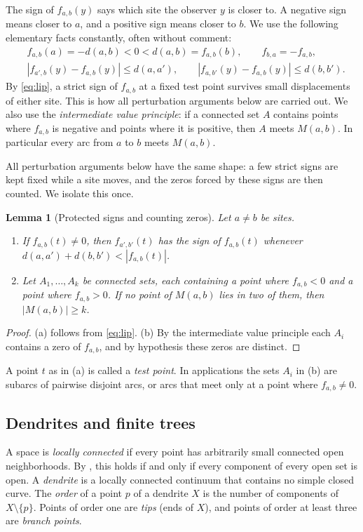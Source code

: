 \documentclass[11pt]{amsart}
\newtheorem{lemma}[theorem]{Lemma}
\theoremstyle{definition}
\theoremstyle{remark}
\newcommand{\M}{M}
\begin{document}
\noindent
The sign of $f_{a,b}(y)$ says which site the observer $y$ is closer to. A negative sign means closer to $a$, and a positive sign means closer to $b$. We use the following elementary facts constantly, often without comment:
\begin{align}
 &f_{a,b}(a)=-d(a,b)<0<d(a,b)=f_{a,b}(b), \qquad f_{b,a}=-f_{a,b}, \label{eq:basic}\\
 &|f_{a',b}(y)-f_{a,b}(y)|\le d(a,a'),\qquad |f_{a,b'}(y)-f_{a,b}(y)|\le d(b,b'). \label{eq:lip}
\end{align}
By \eqref{eq:lip}, a strict sign of $f_{a,b}$ at a fixed test point survives small displacements of either site. This is how all perturbation arguments below are carried out. We also use the \emph{intermediate value principle}: if a connected set $A$ contains points where $f_{a,b}$ is negative and points where it is positive, then $A$ meets $\M(a,b)$. In particular every arc from $a$ to $b$ meets $\M(a,b)$.

All perturbation arguments below have the same shape: a few strict signs are kept fixed while a site moves, and the zeros forced by these signs are then counted. We isolate this once.

\begin{lemma}[Protected signs and counting zeros]\label{lem:count}
Let $a\ne b$ be sites.
\begin{enumerate}[label=\textup{(\alph*)}]
\item If $f_{a,b}(t)\ne0$, then $f_{a',b'}(t)$ has the sign of $f_{a,b}(t)$ whenever $d(a,a')+d(b,b')<|f_{a,b}(t)|$.
\item Let $A_1,\dots,A_k$ be connected sets, each containing a point where $f_{a,b}<0$ and a point where $f_{a,b}>0$. If no point of $\M(a,b)$ lies in two of them, then $|\M(a,b)|\ge k$.
\end{enumerate}
\end{lemma}
\begin{proof}
(a) follows from \eqref{eq:lip}. (b) By the intermediate value principle each $A_i$ contains a zero of $f_{a,b}$, and by hypothesis these zeros are distinct.
\end{proof}

\noindent
A point $t$ as in (a) is called a \emph{test point}. In applications the sets $A_i$ in (b) are subarcs of pairwise disjoint arcs, or arcs that meet only at a point where $f_{a,b}\ne0$.

\subsection{Dendrites and finite trees}
A space is \emph{locally connected} if every point has arbitrarily small connected open neighborhoods. By \cite[Theorem~25.3]{Mun00}, this holds if and only if every component of every open set is open. A \emph{dendrite} is a locally connected continuum that contains no simple closed curve. The \emph{order} of a point $p$ of a dendrite $X$ is the number of components of $X\setminus\{p\}$. Points of order one are \emph{tips} (ends of $X$), and points of order at least three are \emph{branch points}.
\end{document}
